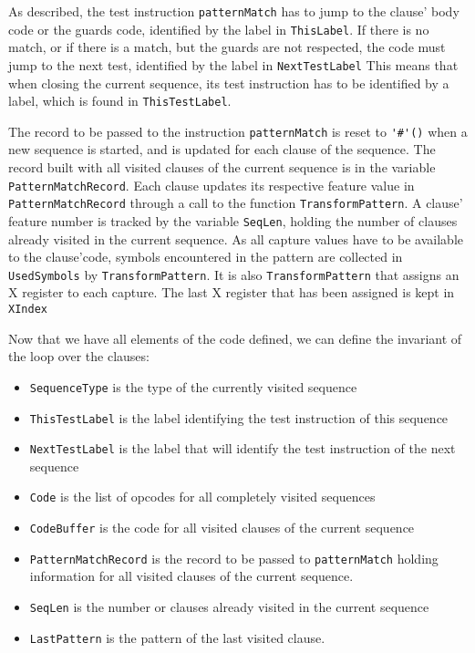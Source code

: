 \documentclass[a4paper]{memoir}
\begin{document}
As described, the test instruction \lstinline!patternMatch! has to jump to the
clause' body code or the guards code, identified by the label in
\lstinline!ThisLabel!. If there is no match, or if there is a match, but the
guards are not respected, the code must jump to the next test, identified by the
label in \lstinline!NextTestLabel!
This means that when closing the current sequence, its test instruction has to
be identified by a label, which is found in \lstinline!ThisTestLabel!.

The record to be passed to the instruction \lstinline!patternMatch! is reset to
\lstinline!'#'()! when a new sequence is started, and is updated for each clause
of the sequence. The record built with all visited clauses of the current
sequence is in the variable \lstinline!PatternMatchRecord!.
Each clause updates its respective feature value in
\lstinline!PatternMatchRecord! through a call to the function \lstinline!TransformPattern!.
A clause' feature number is tracked by the
variable \lstinline!SeqLen!, holding the number of clauses already visited in
the current sequence.
As all capture values have to be available to the clause'code, symbols encountered
in the pattern are collected in \lstinline!UsedSymbols! by
\lstinline!TransformPattern!. It is also \lstinline!TransformPattern! that
assigns an X register to each capture. The last X register that has been
assigned is kept in \lstinline!XIndex!

Now that we have all elements of the code defined, we can define the invariant
of the loop over the clauses:

\begin{itemize}
  \item \lstinline!SequenceType! is the type of the currently visited sequence 
  \item \lstinline!ThisTestLabel! is the label identifying the test instruction of this sequence
  \item \lstinline!NextTestLabel! is the label that will identify the test
    instruction of the next sequence
  \item \lstinline!Code! is the list of opcodes for all completely visited sequences
  \item \lstinline!CodeBuffer! is the code for all visited clauses of the current sequence
  \item \lstinline!PatternMatchRecord! is the record to be passed to \lstinline!patternMatch!
        holding information for all visited clauses of the current sequence.
  \item \lstinline!SeqLen! is the number or clauses already visited in the current sequence
  \item \lstinline!LastPattern! is the pattern of the last visited clause.
\end{itemize}
\end{document}
